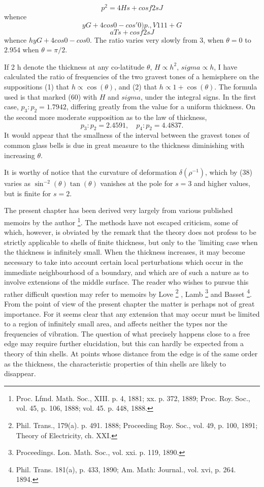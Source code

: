 \[ p^2 = 4 H s + cos f 2 s J
\]
whence
\[ yG + 4 cos 0 - cos' 0 ) p., V 1 1 1 + G
\]
\[
a T s + cos f 2 s J
\]
whence \(h  yG + 4 cos 0 - cos 0 \).
The ratio varies very slowly from 3, when
\(\theta = 0 \)
to
\(2.954\) when
\(\theta = \pi/2 \).

If 2 h denote the thickness at any co-latitude
\(\theta \),
\( H \propto h^2 \),
\( sigma  \propto h \),
I have calculated the ratio of frequencies of the two gravest tones
of a hemisphere on the suppositions (1) that
\( h \propto \cos(\theta) \),
and (2) that
\( h \propto 1 + \cos(\theta) \).
The
formula used is that marked (60) with
\( H \) and
\( sigma \),
under the integral signs. In the first case,
\( p_3 : p_2 = 1.7942\), differing
greatly from the value for a uniform thickness.  On the second
more moderate supposition as to the law of thickness,
\[ p_3 : p_2 = 2.4591,  \quad p_4 : p_2 = 4.4837. \]
It would appear that the smallness of the interval between the gravest tones
of common glass bells is due in great measure to the thickness diminishing with
increasing
\(\theta \).

It is worthy of notice that the curvature of deformation
\(\delta( \rho^{-1} ) \),
which by (38) varies as
\( \sin^{-2} (\theta )  \tan (\theta )  \)
vanishes at the pole for \( s=3 \) and higher values, but is
finite for \( s=2 \).

The present chapter has been derived very largely from various published
memoirs by the author
\footnote{
Proc. Lfmd. Math. Soc., XIII. p. 4, 1881; xx. p. 372, 1889; Proc. Roy. Soc.,
vol.  45, p. 106, 1888; vol. 45. p. 448, 1888.
}.
The methods have not escaped criticism, some of which,
however, is obviated by the remark that the theory does not profess to be
strictly applicable to shells of finite thickness, but only to the 'limiting
case when the thickness is infinitely small. When the thickness increases, it
may become necessary to take into account certain local perturbations which
occur in the immediate neighbourhood of a boundary, and which are of such a
nature as to involve extensions of the middle surface. The reader who wishes to
pursue this rather difficult question may refer to memoirs by
Love \footnote{Phil. Trans., 179(a). p. 491. 1888; Proceeding Roy. Soc., vol.
49, p. 100, 1891; Theory of Electricity, ch. XXI.} ,
Lamb \footnote{ Proceedings. Lon. Math. Soc., vol. xxi. p. 119, 1890.} and
Basset \footnote{Phil. Trans. 181(a), p. 433, 1890; Am. Math: Journal., vol.
xvi, p. 264. 1894.}.  From the point of view of the present chapter the matter
is perhaps not of great importance. For it seems clear that any extension that
may occur must be limited to a region of infinitely small area, and affects
neither the types nor the frequencies of vibration. The question of what
precisely happens close to a free edge may require further elucidation, but
this can hardly be expected from a theory of thin shells. At points whose
distance from the edge is of the same order as the thickness, the
characteristic properties of thin shells are likely to disappear.

